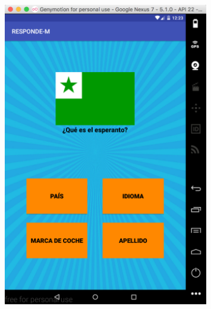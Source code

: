\documentclass[10pt]{article}
\begin{document}
\begin{figure}[H]
	\begin{center}
 		\includegraphics[width = 0.8\textwidth]{Imagenes/captura2.eps}
	\end{center} 
\end{figure}
\end{document}

